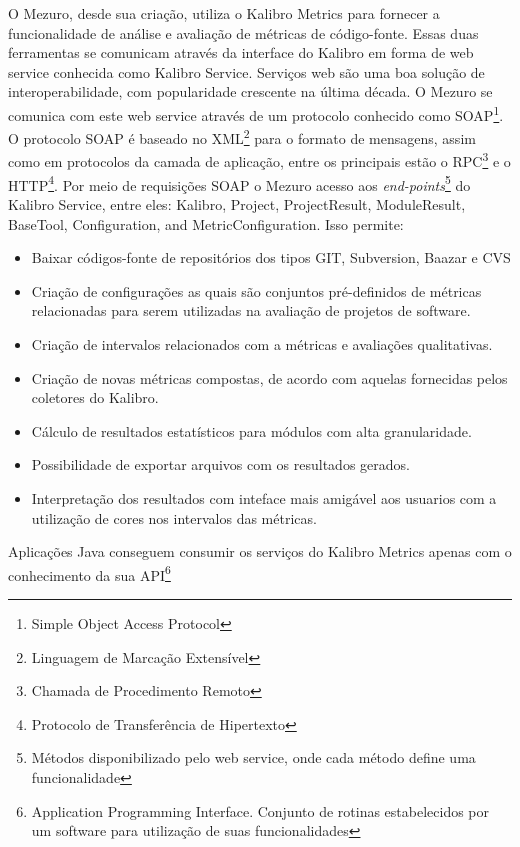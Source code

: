 O Mezuro, desde sua criação, utiliza o Kalibro Metrics para fornecer a funcionalidade de análise e avaliação de métricas de código-fonte. Essas duas ferramentas se comunicam através da interface do Kalibro em forma de web service conhecida como Kalibro Service. Serviços web são uma boa solução de interoperabilidade, com popularidade crescente na última década. O Mezuro se comunica com este web service através de um protocolo conhecido como SOAP\footnote{Simple Object Access Protocol}. O protocolo SOAP é baseado no XML\footnote{Linguagem de Marcação Extensível} para o formato de mensagens, assim como em protocolos da camada de aplicação, entre os principais estão o RPC\footnote{Chamada de Procedimento Remoto} e o HTTP\footnote{Protocolo de Transferência de Hipertexto}. Por meio de requisições SOAP o Mezuro acesso aos \textit{end-points}\footnote{Métodos disponibilizado pelo web service, onde cada método define uma funcionalidade} do Kalibro Service, entre eles: Kalibro, Project, ProjectResult, ModuleResult, BaseTool, Configuration, and MetricConfiguration. Isso permite:

\begin{itemize}
\item Baixar códigos-fonte de repositórios dos tipos GIT, Subversion, Baazar e CVS
\item Criação de configurações as quais são conjuntos pré-definidos de métricas relacionadas para serem utilizadas na avaliação de projetos de software.
\item Criação de intervalos relacionados com a métricas e avaliações qualitativas.
\item Criação de novas métricas compostas, de acordo com aquelas fornecidas pelos coletores do Kalibro.
\item Cálculo de resultados estatísticos para módulos com alta granularidade.
\item Possibilidade de exportar arquivos com os resultados gerados.
\item Interpretação dos resultados com inteface mais amigável aos usuarios com a utilização de cores nos intervalos das métricas.
\end{itemize}

Aplicações Java conseguem consumir os serviços do Kalibro Metrics apenas com o conhecimento da sua API\footnote{Application Programming Interface. Conjunto de rotinas estabelecidos por um software para utilização de suas funcionalidades}

